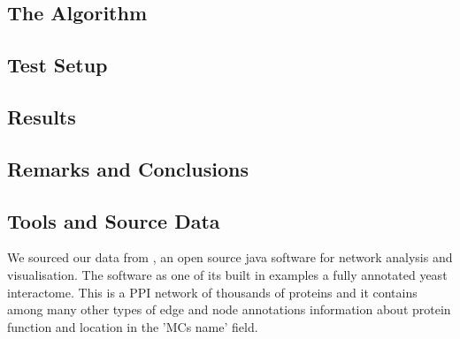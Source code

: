 \subsection*{The Algorithm}

\subsection*{Test Setup}

\subsection*{Results}

\subsection*{Remarks and Conclusions}

%
%

\subsection{Tools and Source Data}

We sourced our data from \textcite{cytoscape}, an open source
java software for network analysis and visualisation. 
The software as one of its built in examples a
fully annotated yeast interactome. This is a PPI network of
thousands of proteins and it contains among many other types of
edge and node annotations information about protein function and
location in the 'MCs name' field.

